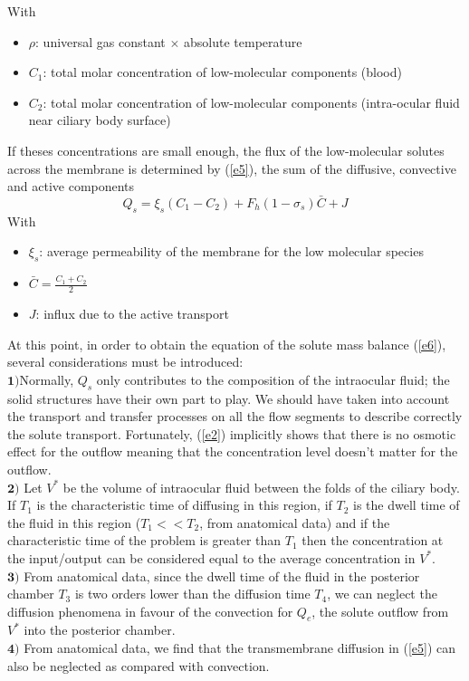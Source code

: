 \documentclass[english,12pt]{article}
\begin{document}
With
\begin{itemize}
\item $\rho$: universal gas constant $\times$  absolute temperature
\item $C_1$: total molar concentration of low-molecular components (blood)
\item $C_2$: total molar concentration of low-molecular components (intra-ocular fluid near ciliary body surface)
\end{itemize}
If theses concentrations are small enough, the flux of the low-molecular solutes across the membrane is determined by (\ref{e5}), the sum of the diffusive, convective and active components
\begin{equation}
Q_s=\xi_s(C_1-C_{2})+F_h (1-\sigma_s) \bar{C}+J
\label{e5}
\end{equation}
With
\begin{itemize}
\item $\xi_s$: average permeability of the membrane for the low molecular species
\item $\bar{C}=\frac{C_1+C_2}{2}$
\item $J$: influx due to the active transport
\end{itemize}
At this point, in order to obtain the equation of the solute mass balance (\ref{e6}), several considerations must be introduced:\\
$\textbf{1)}$Normally, $Q_s$ only contributes to the composition of the intraocular fluid; the solid structures have their own part to play. We should have taken into account the transport and transfer processes on all the flow segments to describe correctly the solute transport. Fortunately, (\ref{e2}) implicitly shows that there is no osmotic effect for the outflow meaning that the concentration level doesn't matter for the outflow.\\
$\textbf{2)}$ Let $V^{\ast}$ be the volume of intraocular fluid between the folds of the ciliary body. If $T_1$ is the characteristic time of diffusing in this region, if $T_2$ is the dwell time of the fluid in this region ($T_1<<T_2$, from anatomical data) and if the characteristic time of the problem is greater than $T_1$ then the concentration at the input/output can be considered equal to the average concentration in $V^{\ast}$.\\
$\textbf{3)}$ From anatomical data, since the dwell time of the fluid in the posterior chamber $T_3$ is two orders lower than the diffusion time $T_4$, we can neglect the diffusion phenomena in favour of the convection for $Q_e$, the solute outflow from $V^{\ast}$ into the posterior chamber.\\
$\textbf{4)}$ From anatomical data, we find that the transmembrane diffusion in (\ref{e5}) can also be neglected as compared with convection.\\
\end{document}
